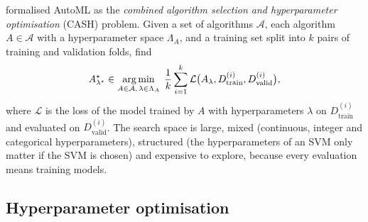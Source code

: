 \citet{thornton2013auto} formalised AutoML as the \emph{combined algorithm selection and
hyperparameter optimisation} (CASH) problem. Given a set of algorithms $\mathcal{A}$, each algorithm
$A\in\mathcal{A}$ with a hyperparameter space $\Lambda_A$, and a training set split into $k$ pairs of
training and validation folds, find
\begin{equation}\label{eq:cash}
  A^\star_{\lambda^\star}\in\operatorname*{arg\,min}_{A\in\mathcal{A},\,\lambda\in\Lambda_A}\;
  \frac1k\sum_{i=1}^{k}\mathcal{L}\bigl(A_\lambda,D_{\text{train}}^{(i)},D_{\text{valid}}^{(i)}\bigr),
\end{equation}
where $\mathcal{L}$ is the loss of the model trained by $A$ with hyperparameters $\lambda$ on
$D_{\text{train}}^{(i)}$ and evaluated on $D_{\text{valid}}^{(i)}$. The search space is large,
mixed (continuous, integer and categorical hyperparameters), structured (the hyperparameters of an
SVM only matter if the SVM is chosen) and expensive to explore, because every evaluation means
training models.

\subsection{Hyperparameter optimisation}

